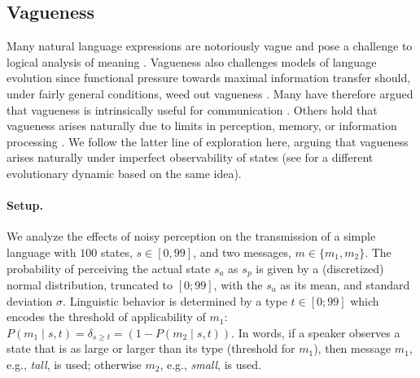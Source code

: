 \documentclass[10pt,a4paper]{article}
\newcommand{\mf}[1]{\textcolor{Red}{[MF: #1]}}
\begin{document}

\subsection{Vagueness}

Many natural language expressions are notoriously vague and pose a challenge to logical
analysis of meaning \citep[e.g.][]{Williamson1994:Vagueness}. Vagueness also challenges models
of language evolution since functional pressure towards maximal information transfer should,
under fairly general conditions, weed out vagueness \citep{Lipman2009:Why-is-Language}. Many
have therefore argued that vagueness is intrinsically useful for communication
\citep[e.g.][]{Deemter2009:Utility-and-Lan,Jaegherde-JaegherRooijvan-Rooij2010:Strategic-Vague,BlumeBoard2013:Intentional-Vag}. Others
hold that vagueness arises naturally due to limits in perception, memory, or information
processing
\citep[e.g.][]{FrankeJager2010:Vagueness-Signa,OConnor2013:The-Evolution-o,LassiterGoodman2015:Adjectival-vagu}. We
follow the latter line of exploration here, arguing that vagueness arises naturally under
imperfect observability of states (see \cite{franke+correia:toappear} for a different
evolutionary dynamic based on the same idea).

\paragraph{Setup.}  We analyze the effects of noisy perception on the transmission of a simple
language with $100$ states, $s \in [0,99]$, and two messages, $m \in \{m_1,m_2\}$. The
probability of perceiving the actual state $s_a$ as $s_p$ is given by a (discretized) normal
distribution, truncated to $[0;99]$, with the $s_a$ as its mean, and standard deviation
$\sigma$. %
Linguistic behavior is determined by a type $t \in [0;99]$ which encodes the threshold of
applicability of $m_1$: $P(m_1 \mid s,t) = \delta_{s \ge t} = (1 - P(m_2 \mid s,t))$. In words, if a speaker observes a
state that is as large or larger than its type (threshold for $m_1$), then message $m_1$, e.g.,
{\em tall}, is used; otherwise $m_2$, e.g., {\em small}, is used.
\end{document}
